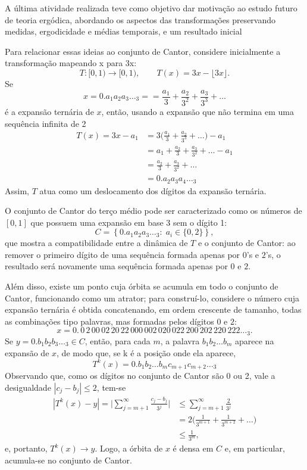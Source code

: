 \documentclass[12pt, a4paper]{article}
\theoremstyle{definition}
\begin{document}
A última atividade realizada teve como objetivo dar motivação ao estudo futuro de teoria ergódica, abordando os aspectos das transformações preservando medidas, ergodicidade e médias temporais, e um resultado inicial

Para relacionar essas ideias ao conjunto de Cantor, considere inicialmente a transformação mapeando x para 3x:
\[
	T:[0,1)\longrightarrow[0,1),
	\qquad
	T(x)=3x-\lfloor 3x\rfloor.
\]
Se
\[
	x=0.a_1a_2a_3\ldots{}_3 == \frac{a_1}{3} + \frac{a_2}{3^{2}}+ \frac{a_3}{3^{3}} + \dotsc
\]
é a expansão ternária de $x$, então, usando a expansão que não termina em uma sequência infinita de 2
\begin{align*}
	T(x) = 3x - a_1 & = 3\biggl(\frac{a_1}{3} + \frac{a_2}{3^{3}}+\dotsc \biggr)-a_1 \\
	                & = a_1 + \frac{a_2}{3} + \frac{a_3}{3^{2}}+\dotsc -a_1          \\
	                & = \frac{a_2}{3} + \frac{a_3}{3^{2}} + \dotsc                   \\
	                & = 0.a_2a_3a_4\ldots{}_3
\end{align*}
Assim, $T$ atua como um deslocamento dos dígitos da expansão ternária.

O conjunto de Cantor do terço médio pode ser caracterizado como os números de \([0, 1]\) que possuem uma expansão em base 3 sem o dígito 1:
\[
	C=\left\{0.a_1a_2a_3\ldots{}_3:\;a_i\in\{0,2\}\right\},
\]
que mostra a compatibilidade entre a dinâmica de $T$ e o conjunto de Cantor: ao remover o primeiro dígito de uma sequência formada apenas por $0$'s e $2$'s, o resultado será novamente uma sequência formada apenas por $0$ e $2$.

Além disso, existe um ponto cuja órbita se acumula em todo o conjunto de Cantor, funcionando como um atrator; para construí-lo, considere o número cuja expansão ternária é obtida concatenando, em ordem crescente de tamanho, todas as combinações tipo palavras, mas formadas pelos dígitos $0$ e $2$:
\[
	x=0.\,0\,2\,00\,02\,20\,22\,000\,002\,020\,022\,200\,202\,220\,222\ldots{}_3.
\]
Se $y=0.b_1b_2b_3\ldots{}_3\in C$, então, para cada $m$, a palavra $b_1b_2\ldots b_m$ aparece na expansão de $x$, de modo que, se k é a posição onde ela aparece,
\[
	T^{k}(x) = 0.b_1b_2\ldots b_mc_{m+1}c_{m+2}\dotsc_{3}
\]
Observando que, como os dígitos no conjunto de Cantor são 0 ou 2, vale a desigualdade \(| c_{j}-b_{j} |\leq 2\), tem-se
\begin{align*}
	\left|T^{k}(x)-y\right| = \biggl\vert \sum\limits_{j=m+1}^{\infty}\frac{c_{j}-b_{j}}{3^{j}} \biggr\vert & \leq \sum\limits_{j=m+1}^{\infty}\frac{2}{3^{j}}            \\
	                                                                                                        & =2\biggl(\frac{1}{3^{m+1}}+\frac{1}{3^{m+2}}+\dotsc \biggr) \\
	                                                                                                        & \leq \frac{1}{3^m},
\end{align*}
e, portanto, $T^{k}(x)\to y$. Logo, a órbita de $x$ é densa em $C$ e, em particular, acumula-se no conjunto de Cantor.
\end{document}
